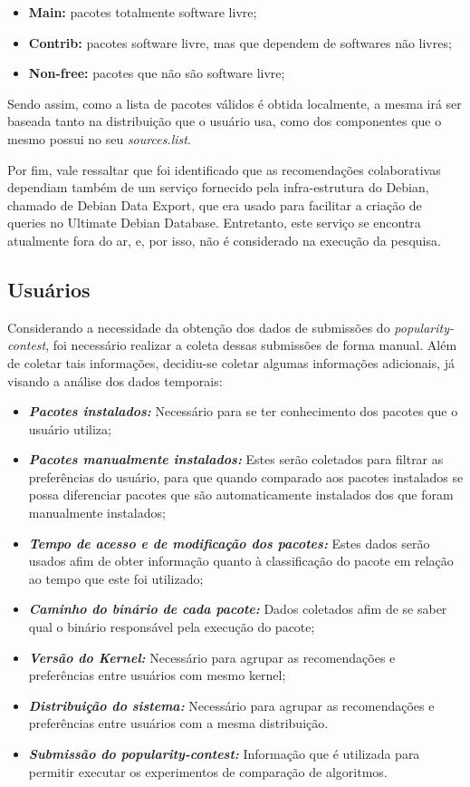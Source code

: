 \begin{itemize}
    \item \textbf{Main:} pacotes totalmente software livre;
    \item \textbf{Contrib:} pacotes software livre, mas que dependem de
        softwares não livres;
    \item \textbf{Non-free:} pacotes que não são software livre;
\end{itemize}

Sendo assim, como a lista de pacotes válidos é obtida localmente, a mesma irá ser baseada tanto na
distribuição que o usuário usa, como dos componentes que o mesmo possui no seu
\textit{sources.list}.

Por fim, vale ressaltar que foi identificado que as recomendações
colaborativas dependiam também de um serviço fornecido pela infra-estrutura do
Debian, chamado de Debian Data Export, que era usado para facilitar a criação de
queries no Ultimate Debian Database. Entretanto, este serviço se encontra
atualmente fora do ar, e, por isso, não é considerado na execução da pesquisa.

\subsection{Usuários} \label{sec:coleta_dados_usuario}

Considerando a necessidade da obtenção dos dados de submissões do
\textit{popularity-contest}, foi necessário realizar a coleta dessas submissões
de forma manual. Além de coletar tais informações, decidiu-se coletar algumas
informações adicionais, já visando a análise dos dados temporais:

\begin{itemize}
    \item \textit{\textbf{Pacotes instalados:}} Necessário para se ter conhecimento dos pacotes que o usuário utiliza;
    \item \textit{\textbf{Pacotes manualmente instalados:}} Estes serão coletados para filtrar as preferências do usuário, para que quando comparado aos pacotes instalados se possa diferenciar pacotes que são automaticamente instalados dos que foram manualmente instalados;
    \item \textit{\textbf{Tempo de acesso e de modificação dos pacotes:}} Estes dados serão usados afim de obter
        informação quanto à classificação do pacote em relação ao tempo que este foi utilizado;
    \item \textit{\textbf{Caminho do binário de cada pacote:}} Dados coletados afim de se saber qual o binário responsável pela execução do pacote;
    \item \textit{\textbf{Versão do Kernel:}} Necessário para agrupar as recomendações e preferências entre usuários com mesmo kernel;
    \item \textit{\textbf{Distribuição do sistema:}} Necessário para agrupar as recomendações e preferências entre usuários com a mesma distribuição.
    \item \textit{\textbf{Submissão do popularity-contest:}} Informação que é
        utilizada para permitir executar os experimentos de comparação de
        algoritmos.
\end{itemize}

